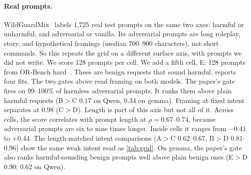 \documentclass[11pt]{article}
\begin{document}
\paragraph{Real prompts.} WildGuardMix~\citep{han2024wildguard} labels 1,725 real test prompts on the
same two axes: harmful or unharmful, and adversarial or vanilla. Its adversarial prompts are long roleplay,
story, and hypothetical framings (median 700--900 characters), not short commands. So this repeats the
grid on a different surface axis, with prompts we did not write. We score 128 prompts per cell. We add a
fifth cell, E: 128 prompts from OR-Bench hard~\citep{cui2024orbench}. These are benign requests that sound
harmful.  reports four fits. The two gates above read framing on both models. The
paper's gate fires on 99--100\% of harmless adversarial prompts. It ranks them above plain harmful requests
(B$>$C 0.17 on Qwen, 0.34 on gemma). Framing at fixed intent separates at 0.98 (C$>$D). Length is part of
this axis but not all of it. Across cells, the score correlates with prompt length at $\rho=0.67$--$0.74$,
because adversarial prompts are six to nine times longer. Inside cells it ranges from $-0.41$ to $+0.44$.
The length-matched intent comparisons (A$>$C 0.62--0.67, B$>$D 0.81--0.96) show the same weak intent read
as \cref{tab:grid}. On gemma, the paper's gate also ranks harmful-sounding benign prompts well above plain
benign ones (E$>$D 0.90; 0.62 on Qwen).
\end{document}
